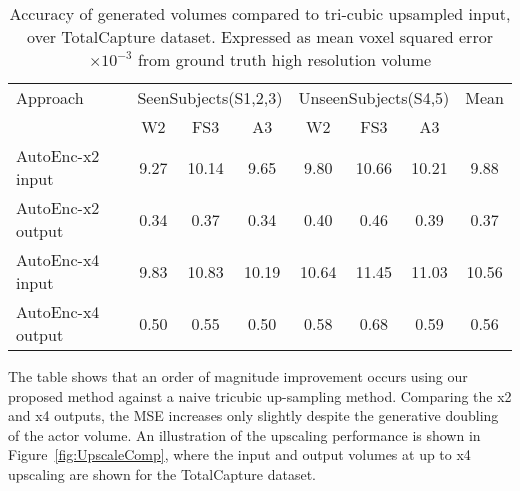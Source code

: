 \documentclass[runningheads]{llncs}
\begin{document}
\begin{table}[htb]
\centering
{
\small
\begin{tabular}{lccccccc}
\hline
Approach                     &\multicolumn{3}{c}{SeenSubjects(S1,2,3)}&\multicolumn{3}{c}{UnseenSubjects(S4,5)} & Mean \\
                             & W2 & FS3 & A3 & W2 & FS3 & A3 & \\ \hline
AutoEnc-x2 input    &9.27 & 10.14 & 9.65 & 9.80 & 10.66 & 10.21 & 9.88\\ 
AutoEnc-x2 output    &0.34 & 0.37 & 0.34 & 0.40 & 0.46 & 0.39 & 0.37\\
AutoEnc-x4 input    &9.83 & 10.83 & 10.19 & 10.64 & 11.45 & 11.03 & 10.56\\ 
AutoEnc-x4 output    &0.50 & 0.55 & 0.50 & 0.58 & 0.68 & 0.59 & 0.56\\ \hline
\end{tabular}
}
\caption{Accuracy of generated volumes compared to tri-cubic upsampled input, over TotalCapture dataset. Expressed as mean voxel squared error $\times 10^{-3}$ from ground truth high resolution volume}
\label{tab:totalcapturePVHResults}
\squeezeup
\squeezeup
\end{table}
The table shows that an order of magnitude improvement occurs using our proposed method against a naive tricubic up-sampling method. Comparing the x2 and x4 outputs, the MSE increases only slightly despite the generative doubling of the actor volume. An illustration of the upscaling performance is shown in Figure~\ref{fig:UpscaleComp}, where the input and output volumes at up to x4 upscaling are shown for the TotalCapture dataset.
\end{document}
